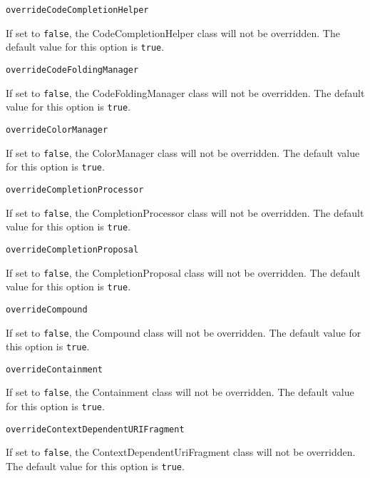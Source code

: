 \noindent\texttt{overrideCodeCompletionHelper}
\begin{myindentpar}{1cm}
If set to \texttt{false}, the CodeCompletionHelper class will not be overridden. The default value for this option is \texttt{true}.
\end{myindentpar}

\noindent\texttt{overrideCodeFoldingManager}
\begin{myindentpar}{1cm}
If set to \texttt{false}, the CodeFoldingManager class will not be overridden. The default value for this option is \texttt{true}.
\end{myindentpar}

\noindent\texttt{overrideColorManager}
\begin{myindentpar}{1cm}
If set to \texttt{false}, the ColorManager class will not be overridden. The default value for this option is \texttt{true}.
\end{myindentpar}

\noindent\texttt{overrideCompletionProcessor}
\begin{myindentpar}{1cm}
If set to \texttt{false}, the CompletionProcessor class will not be overridden. The default value for this option is \texttt{true}.
\end{myindentpar}

\noindent\texttt{overrideCompletionProposal}
\begin{myindentpar}{1cm}
If set to \texttt{false}, the CompletionProposal class will not be overridden. The default value for this option is \texttt{true}.
\end{myindentpar}

\noindent\texttt{overrideCompound}
\begin{myindentpar}{1cm}
If set to \texttt{false}, the Compound class will not be overridden. The default value for this option is \texttt{true}.
\end{myindentpar}

\noindent\texttt{overrideContainment}
\begin{myindentpar}{1cm}
If set to \texttt{false}, the Containment class will not be overridden. The default value for this option is \texttt{true}.
\end{myindentpar}

\noindent\texttt{overrideContextDependentURIFragment}
\begin{myindentpar}{1cm}
If set to \texttt{false}, the ContextDependentUriFragment class will not be overridden. The default value for this option is \texttt{true}.
\end{myindentpar}

